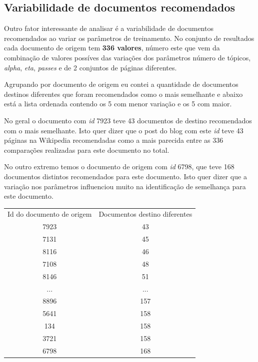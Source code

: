 \subsection{Variabilidade de documentos recomendados}

Outro fator interessante de analisar é a variabilidade de documentos recomendados ao variar os parâmetros de treinamento. No conjunto de resultados cada documento 
de origem tem \textbf{336 valores}, número este que vem da combinação de valores possíves das variações dos parâmetros número de tópicos,
\textit{alpha}, \textit{eta}, \textit{passes} e de 2 conjuntos de páginas diferentes.

Agrupando por documento de origem eu contei a quantidade de documentos destinos diferentes que foram recomendados como o mais semelhante e abaixo
está a lista ordenada contendo os 5 com menor variação e os 5 com maior.

No geral o documento com \textit{id} 7923 teve 43 documentos de destino recomendados com o mais semelhante. Isto quer dizer que o post do blog com 
este \textit{id} teve 43 páginas na Wikipedia recomendadas como a mais parecida entre as 336 comparações realizadas para este documento no total.

No outro extremo temos o documento de origem com \textit{id} 6798, que teve 168 documentos distintos recomendados para este documento. Isto
quer dizer que a variação nos parâmetros influenciou muito na identificação de semelhança para este documento.

\begin{center}
    \begin{tabular}{|c|c|}
        \hline
        Id do documento de origem & Documentos destino diferentes \\
        7923 & 43 \\
        \hline
        7131 & 45 \\
        \hline
        8116 & 46 \\
        \hline
        7108 & 48 \\
        \hline
        8146 & 51 \\
        \hline
        ... & ... \\
        \hline
        8896 & 157 \\
        \hline
        5641 & 158 \\
        \hline
        134 & 158 \\
        \hline
        3721 & 158 \\
        \hline
        6798 & 168 \\
        \hline
    \end{tabular}
\end{center}

